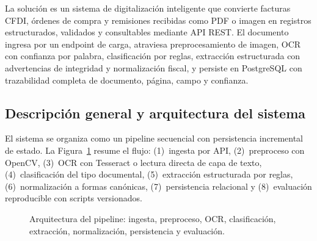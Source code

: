 
La solución es un sistema de digitalización inteligente que convierte facturas CFDI, órdenes de compra y remisiones recibidas como PDF o imagen en registros estructurados, validados y consultables mediante API REST. El documento ingresa por un endpoint de carga, atraviesa preprocesamiento de imagen, OCR con confianza por palabra, clasificación por reglas, extracción estructurada con advertencias de integridad y normalización fiscal, y persiste en PostgreSQL con trazabilidad completa de documento, página, campo y confianza\cite{fastapi_docs, tesseract_ocr}.

\subsection{Descripción general y arquitectura del sistema} \label{sec:prop_descripcion}

El sistema se organiza como un pipeline secuencial con persistencia incremental de estado. La Figura~\ref{fig:arquitectura_sistema} resume el flujo: (1)~ingesta por API, (2)~preproceso con OpenCV, (3)~OCR con Tesseract o lectura directa de capa de texto, (4)~clasificación del tipo documental, (5)~extracción estructurada por reglas, (6)~normalización a formas canónicas, (7)~persistencia relacional y (8)~evaluación reproducible con scripts versionados.

\begin{figure}[H]
\centering
{}
\caption{Arquitectura del pipeline: ingesta, preproceso, OCR, clasificación, extracción, normalización, persistencia y evaluación.}
\label{fig:arquitectura_sistema}
\end{figure}


